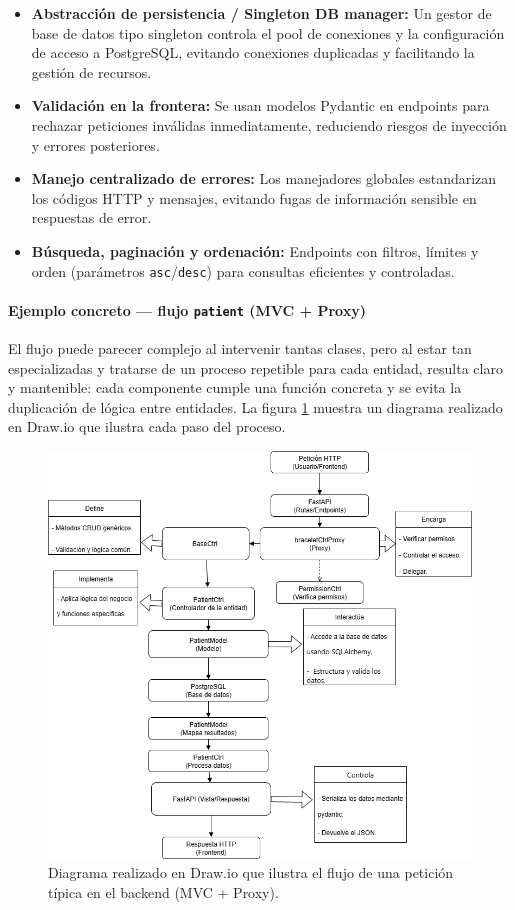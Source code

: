 \documentclass[12pt, a4paper]{article}
\begin{document}
\begin{itemize}
	\item \textbf{Abstracción de persistencia / Singleton DB manager:}  
	Un gestor de base de datos tipo singleton controla el pool de conexiones y la configuración de acceso a PostgreSQL, evitando conexiones duplicadas y facilitando la gestión de recursos.
	\item \textbf{Validación en la frontera:}  
	Se usan modelos Pydantic en endpoints para rechazar peticiones inválidas inmediatamente, reduciendo riesgos de inyección y errores posteriores.
	\item \textbf{Manejo centralizado de errores:}  
	Los manejadores globales estandarizan los códigos HTTP y mensajes, evitando fugas de información sensible en respuestas de error.
	\item \textbf{Búsqueda, paginación y ordenación:}  
	Endpoints con filtros, límites y orden (parámetros \texttt{asc}/\texttt{desc}) para consultas eficientes y controladas.
\end{itemize}

\paragraph{Ejemplo concreto — flujo \texttt{patient} (MVC + Proxy)}

El flujo puede parecer complejo al intervenir tantas clases, pero al estar tan especializadas y tratarse de un proceso repetible para cada entidad, resulta claro y mantenible: cada componente cumple una función concreta y se evita la duplicación de lógica entre entidades. La figura \ref{fig:diagrama} muestra un diagrama realizado en Draw.io que ilustra cada paso del proceso.

\begin{figure}[htbp]
	\centering
	\includegraphics[width=\textwidth]{images/diagrama.png}
	\caption[Diagrama del flujo MVC + Proxy]{Diagrama realizado en Draw.io que ilustra el flujo de una petición típica en el backend (MVC + Proxy).}
	\label{fig:diagrama}
\end{figure}
\end{document}

